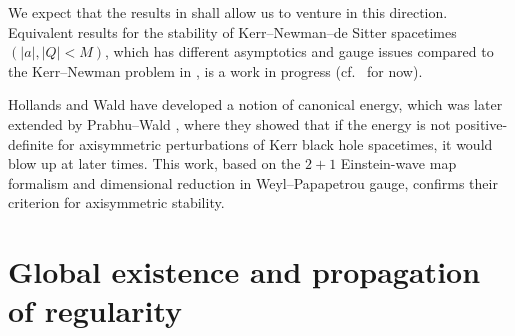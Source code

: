 We expect that the results in \cite{GM17_gentitle} shall allow us to venture in this direction. Equivalent results for the stability of Kerr--Newman--de Sitter spacetimes $(\vert a \vert, \vert Q \vert<M)$, which has different asymptotics and gauge issues compared to the Kerr--Newman problem in \cite{GM17_gentitle}, is a work in progress (cf.\ \cite{NG_17_2, NG_17_1} for now).


Hollands and Wald \cite{WH_13} have developed a notion of canonical energy, which was later extended by Prabhu--Wald \cite{WP_13}, where they showed that if the energy is not positive-definite for axisymmetric perturbations of Kerr black hole spacetimes, it would blow up at later times.
This work, based on the $2+1$ Einstein-wave map formalism and dimensional reduction in Weyl--Papapetrou gauge, confirms their criterion for axisymmetric stability.

\section{Global existence and propagation of regularity}\label{section6}


